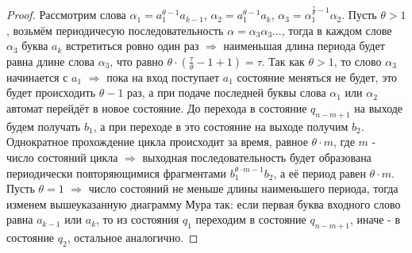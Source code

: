 \documentclass[a4paper, 12pt]{article}
\theoremstyle{definition}
\theoremstyle{plain}
\theoremstyle{remark}
\begin{document}
\begin{proof}
    Рассмотрим слова $\alpha_1=a_1^{\theta-1}a_{k-1}$, $\alpha_2=a_1^{\theta-1}a_k$, $\alpha_3=\alpha_1^{\frac{\tau}{\theta}-1}\alpha_2$. Пусть $\theta>1$, возьмём периодичесую последовательность $\alpha=\alpha_3\alpha_3\ldots$, тогда в каждом слове $\alpha_3$ буква $a_k$ встретиться ровно один раз $\Longrightarrow$ наименьшая длина периода будет равна длине слова $\alpha_3$, что равно $\theta\cdot(\frac{\tau}{\theta}-1+1)=\tau$. Так как $\theta>1$, то слово $\alpha_3$ начинается с $a_1$ $\Longrightarrow$ пока на вход поступает $a_1$ состояние меняться не будет, это будет происходить $\theta-1$ раз, а при подаче последней буквы слова $\alpha_1$ или $\alpha_2$ автомат перейдёт в новое состояние. До перехода в состояние $q_{n-m+1}$ на выходе будем получать $b_1$, а при переходе в это состояние на выходе получим $b_2$. Однократное прохождение цикла происходит за время, равное $\theta\cdot m$, где $m$ - число состояний цикла $\Longrightarrow$ выходная последовательность будет образована периодически повторяющимися фрагментами $b_1^{\theta\cdot m-1}b_2$, а её период равен $\theta\cdot m$.\\
    Пусть $\theta=1$ $\Longrightarrow$ число состояний не меньше длины наименьшего периода, тогда изменем вышеуказанную диаграмму Мура так: если первая буква входного слово равна $a_{k-1}$ или $a_k$, то из состояния $q_1$ переходим в состояние $q_{n-m+1}$, иначе - в состояние $q_2$, остальное аналогично.
  \end{proof}
\end{document}
